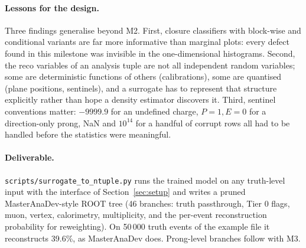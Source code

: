 \paragraph{Lessons for the design.} Three findings generalise beyond M2. First, closure classifiers with block-wise
and conditional variants are far more informative than marginal plots: every defect found in this milestone was
invisible in the one-dimensional histograms. Second, the reco variables of an analysis tuple are not all
independent random variables; some are deterministic functions of others (calibrations), some are quantised
(plane positions, sentinels), and a surrogate has to represent that structure explicitly rather than hope a
density estimator discovers it. Third, sentinel conventions matter: $-9999.9$ for an undefined charge, $P=1,
E=0$ for a direction-only prong, NaN and $10^{14}$ for a handful of corrupt rows all had to be handled before the
statistics were meaningful.

\paragraph{Deliverable.} \texttt{scripts/surrogate\_to\_ntuple.py} runs the trained model on any truth-level
input with the interface of Section~\ref{sec:setup} and writes a pruned MasterAnaDev-style ROOT tree (46
branches: truth passthrough, Tier 0 flags, muon, vertex, calorimetry, multiplicity, and the per-event
reconstruction probability for reweighting). On 50\,000 truth events of the example file it reconstructs
39.6\%, as MasterAnaDev does. Prong-level branches follow with M3.
